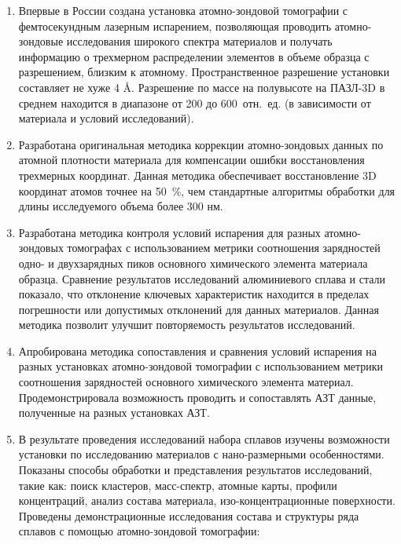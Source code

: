 \begin{enumerate}[beginpenalty=10000]
	\item Впервые в России создана установка атомно-зондовой томографии с фемтосекундным лазерным испарением, позволяющая проводить атомно-зондовые исследования широкого спектра материалов  и получать информацию о трехмерном распределении элементов в объеме образца с разрешением, близким к атомному. Пространственное разрешение установки составляет не хуже 4 \r{A}. Разрешение по массе на полувысоте на ПАЗЛ-3D в среднем находится в диапазоне от 200 до 600~отн.~ед. (в зависимости от материала и условий исследований).
	\item Разработана оригинальная методика коррекции атомно-зондовых данных по атомной плотности материала для компенсации ошибки восстановления трехмерных координат. Данная методика обеспечивает восстановление 3D координат атомов точнее на 50~\%, чем стандартные алгоритмы обработки для длины исследуемого объема более 300 нм.   
	\item Разработана методика контроля условий испарения для разных атомно-зондовых томографах с использованием метрики соотношения зарядностей одно- и двухзарядных пиков основного химического элемента материала образца. Сравнение результатов исследований алюминиевого сплава и стали показало, что отклонение ключевых характеристик находится в пределах погрешности или допустимых отклонений для данных материалов. Данная методика позволит улучшит повторяемость результатов исследований.
	\item Апробирована методика сопоставления и сравнения условий испарения на разных установках атомно-зондовой томографии с использованием метрики соотношения зарядностей основного химического элемента материал. Продемонстрировала возможность проводить и сопоставлять АЗТ данные, полученные на разных установках АЗТ.
	\item В результате проведения исследований набора сплавов изучены возможности установки по исследованию материалов с нано-размерными особенностями. Показаны способы обработки и представления результатов исследований, такие как: поиск кластеров, масс-спектр, атомные карты, профили концентраций, анализ состава материала, изо-концентрационные поверхности.  Проведены демонстрационные исследования состава и структуры ряда сплавов с помощью атомно-зондовой томографии:

\end{enumerate}

